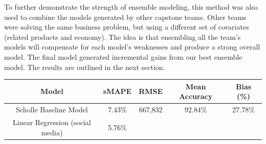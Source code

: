 \documentclass[12pt,oneside]{chicagocapstone}
\begin{document}
To further demonstrate the strength of ensemble modeling, this method
was also used to combine the models generated by other capstone teams.
Other teams were solving the same business problem, but using a
different set of covariates (related products and economy). The idea is
that ensembling all the team's models will compensate for each model's
weaknesses and produce a strong overall model. The final model generated
incremental gains from our best ensemble model. The results are outlined
in the next section.
\begin{longtable}[]{@{}ccccc@{}}
\toprule
\begin{minipage}[b]{0.27\columnwidth}\centering\strut
Model\strut
\end{minipage} & \begin{minipage}[b]{0.13\columnwidth}\centering\strut
sMAPE\strut
\end{minipage} & \begin{minipage}[b]{0.14\columnwidth}\centering\strut
RMSE\strut
\end{minipage} & \begin{minipage}[b]{0.16\columnwidth}\centering\strut
Mean Accuracy\strut
\end{minipage} & \begin{minipage}[b]{0.16\columnwidth}\centering\strut
Bias (\%)\strut
\end{minipage}\tabularnewline
\midrule
\endhead
\begin{minipage}[t]{0.27\columnwidth}\centering\strut
Scholle Baseline Model\strut
\end{minipage} & \begin{minipage}[t]{0.13\columnwidth}\centering\strut
7.43\%\strut
\end{minipage} & \begin{minipage}[t]{0.14\columnwidth}\centering\strut
667,832\strut
\end{minipage} & \begin{minipage}[t]{0.16\columnwidth}\centering\strut
92.84\%\strut
\end{minipage} & \begin{minipage}[t]{0.16\columnwidth}\centering\strut
27.78\%\strut
\end{minipage}\tabularnewline
\begin{minipage}[t]{0.27\columnwidth}\centering\strut
Linear Regression (social media)\strut
\end{minipage} & \begin{minipage}[t]{0.13\columnwidth}\centering\strut
5.76\%\strut

\end{minipage}
\end{longtable}
\end{document}
